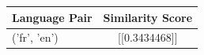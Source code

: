 \begin{tabular}{|l|c|}
\hline
Language Pair & Similarity Score \\
\hline
('fr', 'en') & [[0.3434468]] \\
\hline
\end{tabular}

